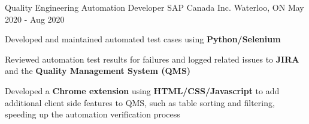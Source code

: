 
\begin{cventries}

  \cventry
    {Quality Engineering Automation Developer} %
    {SAP Canada Inc.} %
    {Waterloo, ON} %
    {May 2020 - Aug 2020} %
    {
      \begin{cvitems} %
        \item {Developed and maintained automated test cases using \textbf{Python/Selenium}}
		\item {Reviewed automation test results for failures and logged related issues to \textbf{JIRA} and the \textbf{Quality Management System (QMS)}}
		\item {Developed a \textbf{Chrome extension} using \textbf{HTML/CSS/Javascript} to add additional client side features to QMS, such as table sorting and filtering, speeding up the automation verification process}
      \end{cvitems}
    }
       
\end{cventries}
